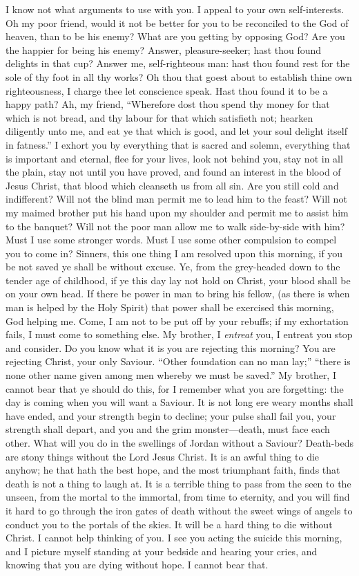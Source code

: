 \documentclass[
]{book}
\begin{document}
I know not what arguments to use with you. I appeal to your own self-interests. Oh my poor friend, would it not be better for you to be reconciled to the God of heaven, than to be his enemy? What are you getting by opposing God? Are you the happier for being his enemy? Answer, pleasure-seeker; hast thou found delights in that cup? Answer me, self-righteous man: hast thou found rest for the sole of thy foot in all thy works? Oh thou that goest about to establish thine own righteousness, I charge thee let conscience speak. Hast thou found it to be a happy path? Ah, my friend, ``Wherefore dost thou spend thy money for that which is not bread, and thy labour for that which satisfieth not; hearken diligently unto me, and eat ye that which is good, and let your soul delight itself in fatness.'' I exhort you by everything that is sacred and solemn, everything that is important and eternal, flee for your lives, look not behind you, stay not in all the plain, stay not until you have proved, and found an interest in the blood of Jesus Christ, that blood which cleanseth us from all sin. Are you still cold and indifferent? Will not the blind man permit me to lead him to the feast? Will not my maimed brother put his hand upon my shoulder and permit me to assist him to the banquet? Will not the poor man allow me to walk side-by-side with him? Must I use some stronger words. Must I use some other compulsion to compel you to come in? Sinners, this one thing I am resolved upon this morning, if you be not saved ye shall be without excuse. Ye, from the grey-headed down to the tender age of childhood, if ye this day lay not hold on Christ, your blood shall be on your own head. If there be power in man to bring his fellow, (as there is when man is helped by the Holy Spirit) that power shall be exercised this morning, God helping me. Come, I am not to be put off by your rebuffs; if my exhortation fails, I must come to something else. My brother, I \emph{entreat} you, I entreat you stop and consider. Do you know what it is you are rejecting this morning? You are rejecting Christ, your only Saviour. ``Other foundation can no man lay;'' ``there is none other name given among men whereby we must be saved.'' My brother, I cannot bear that ye should do this, for I remember what you are forgetting: the day is coming when you will want a Saviour. It is not long ere weary months shall have ended, and your strength begin to decline; your pulse shall fail you, your strength shall depart, and you and the grim monster---death, must face each other. What will you do in the swellings of Jordan without a Saviour? Death-beds are stony things without the Lord Jesus Christ. It is an awful thing to die anyhow; he that hath the best hope, and the most triumphant faith, finds that death is not a thing to laugh at. It is a terrible thing to pass from the seen to the unseen, from the mortal to the immortal, from time to eternity, and you will find it hard to go through the iron gates of death without the sweet wings of angels to conduct you to the portals of the skies. It will be a hard thing to die without Christ. I cannot help thinking of you. I see you acting the suicide this morning, and I picture myself standing at your bedside and hearing your cries, and knowing that you are dying without hope. I cannot bear that. 
\end{document}

